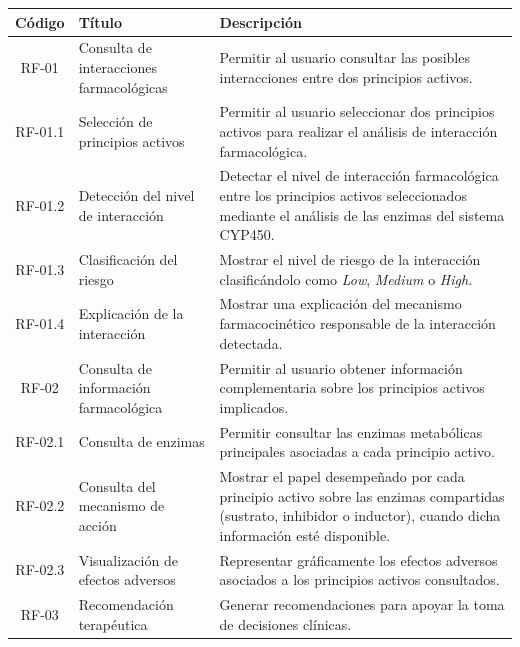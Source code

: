 \begin{table}[ht]
\centering
\small
\begin{tabularx}{\textwidth}{c p{4.5cm} X}
\toprule
\textbf{Código} & \textbf{Título} & \textbf{Descripción} \\
\midrule

RF-01 & Consulta de interacciones farmacológicas &
Permitir al usuario consultar las posibles interacciones entre dos principios activos. \\

RF-01.1 & Selección de principios activos &
Permitir al usuario seleccionar dos principios activos para realizar el análisis de interacción farmacológica. \\

RF-01.2 & Detección del nivel de interacción &
Detectar el nivel de interacción farmacológica entre los principios activos seleccionados mediante el análisis de las enzimas del sistema CYP450. \\

RF-01.3 & Clasificación del riesgo &
Mostrar el nivel de riesgo de la interacción clasificándolo como \textit{Low}, \textit{Medium} o \textit{High}. \\

RF-01.4 & Explicación de la interacción &
Mostrar una explicación del mecanismo farmacocinético responsable de la interacción detectada. \\

\midrule

RF-02 & Consulta de información farmacológica &
Permitir al usuario obtener información complementaria sobre los principios activos implicados. \\

RF-02.1 & Consulta de enzimas &
Permitir consultar las enzimas metabólicas principales asociadas a cada principio activo. \\

RF-02.2 & Consulta del mecanismo de acción &
Mostrar el papel desempeñado por cada principio activo sobre las enzimas compartidas (sustrato, inhibidor o inductor), cuando dicha información esté disponible. \\

RF-02.3 & Visualización de efectos adversos &
Representar gráficamente los efectos adversos asociados a los principios activos consultados. \\

\midrule

RF-03 & Recomendación terapéutica &
Generar recomendaciones para apoyar la toma de decisiones clínicas. \\


\end{tabularx}
\end{table}
